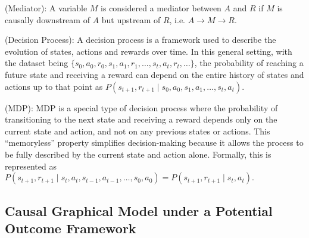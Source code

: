 \begin{definition}(Mediator): A variable $M$ is considered a mediator between $A$ and $R$ if $M$ is causally downstream of $A$ but upstream of $R$, i.e. $A\rightarrow M\rightarrow R$.
    
\end{definition}


\begin{definition}(Decision Process): 
A decision process is a framework used to describe the evolution of states, actions and rewards over time. In this general setting, with the dataset being $\{s_0, a_0, r_0, s_1, a_1, r_1, \dots, s_t, a_t, r_t, \dots\}$, the probability of reaching a future state and receiving a reward can depend on the entire history of states and actions up to that point as 
$
P(s_{t+1}, r_{t+1} \mid s_0, a_0, s_1, a_1, \ldots, s_t, a_t).
$
\end{definition}

\begin{definition}\label{def:MDP}(\acrfull{MDP}): 
\acrshort{MDP} is a special type of decision process where the probability of transitioning to the next state and receiving a reward depends only on the current state and action, and not on any previous states or actions. This ``memoryless'' property simplifies decision-making because it allows the process to be fully described by the current state and action alone. Formally, this is represented as
$
P(s_{t+1}, r_{t+1} \mid s_t, a_t, s_{t-1}, a_{t-1}, \ldots, s_0, a_0) = P(s_{t+1}, r_{t+1} \mid s_t, a_t).
$
\end{definition}





\subsection{Causal Graphical Model under a Potential Outcome Framework} \label{sec:prelim_CSL}


